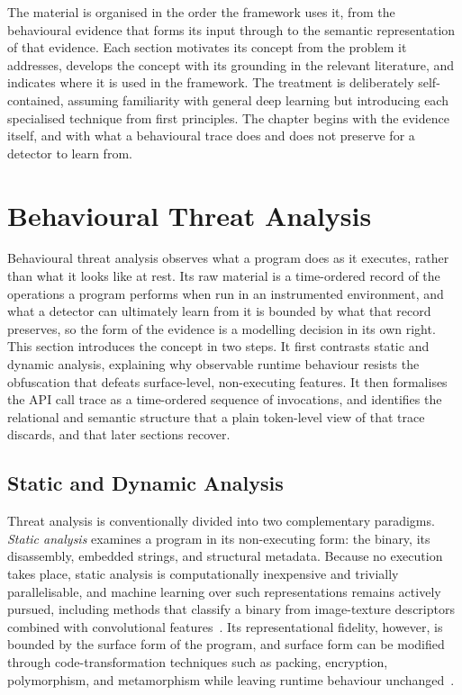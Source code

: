\documentclass[%
    BCOR=10mm,
    DIV=13,
    toc=bibliography,
    toc=listof,
    oneside,
    12pt,
]{scrbook}
\begin{document}
The material is organised in the order the framework uses it, from the
behavioural evidence that forms its input through to the semantic representation
of that evidence. Each section motivates its concept from the problem it
addresses, develops the concept with its grounding in the relevant literature,
and indicates where it is used in the framework. The treatment is deliberately
self-contained, assuming familiarity with general deep learning but introducing
each specialised technique from first principles. The chapter begins with the
evidence itself, and with what a behavioural trace does and does not preserve for a
detector to learn from.

\section{Behavioural Threat Analysis}
\label{sec:behavioural_threat}

Behavioural threat analysis observes what a program does as it executes, rather
than what it looks like at rest. Its raw material is a time-ordered record of the
operations a program performs when run in an instrumented environment, and what a
detector can ultimately learn from it is bounded by what that record preserves,
so the form of the evidence is a modelling decision in its own right. This
section introduces the concept in two steps. It first contrasts static and
dynamic analysis, explaining why observable runtime behaviour resists the
obfuscation that defeats surface-level, non-executing features. It then
formalises the API call trace as a time-ordered sequence of invocations, and
identifies the relational and semantic structure that a plain token-level view of
that trace discards, and that later sections recover.

\subsection{Static and Dynamic Analysis}
\label{subsec:static_dynamic}

Threat analysis is conventionally divided into two complementary paradigms.
\textit{Static analysis} examines a program in its non-executing form: the
binary, its disassembly, embedded strings, and structural metadata. Because no
execution takes place, static analysis is computationally inexpensive and
trivially parallelisable, and machine learning over such representations
remains actively pursued, including methods that classify a binary from
image-texture descriptors combined with convolutional features~\cite{nisa2020}.
Its representational fidelity, however, is bounded by the surface form of the
program, and surface form can be modified through code-transformation
techniques such as packing, encryption, polymorphism, and metamorphism while
leaving runtime behaviour unchanged~\cite{ucci2019survey, ye2017survey}.
\end{document}

